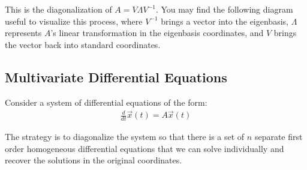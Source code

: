 This is the diagonalization of $\boxed{A = V \Lambda V^{-1}}$. You may find the following diagram useful to visualize this process, where $V^{-1}$ brings a vector into the eigenbasis, $\Lambda$ represents $A$'s linear transformation in the eigenbasis coordinates, and $V$ brings the vector back into standard coordinates.
\begin{figure}[H]
    \centering
\end{figure}

\subsection*{Multivariate Differential Equations}
Consider a system of differential equations of the form:
\begin{align*}
    \frac{d}{dt} \vec{x}(t) = A \vec{x}(t)
\end{align*}

The strategy is to diagonalize the system so that there is a set of $n$ separate first order homogeneous differential equations that we can solve individually and recover the solutions in the original coordinates.

